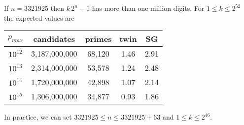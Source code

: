 \documentclass[a4paper, 12pt]{article}
\newcommand\T{\rule{0pt}{2.6ex}}
\newcommand\B{\rule[-1.4ex]{0pt}{0pt}}
\theoremstyle{plain}
\theoremstyle{definition}
\begin{document}
If $n = 3321925$ then $k\,2^n - 1$ has more than one million digits.
For $1 \leq k \leq 2^{52}$ the expected values are
\begin{center}
\begin{tabular}{ccccc}
$p_{max}$ & candidates & primes & twin & SG \B\\
\hline \T
$10^{12}$ & 3,187,000,000 & 68,120 & 1.46 & 2.91 \B \\
$10^{13}$ & 2,314,000,000 & 53,578 & 1.24 & 2.48 \B \\
$10^{14}$ & 1,720,000,000 & 42,898 & 1.07 & 2.14 \B \\
$10^{15}$ & 1,306,000,000 & 34,877 & 0.93 & 1.86
\end{tabular}
\bigskip
\end{center}

In practice, we can set $3321925 \leq n \leq 3321925 + 63$ and $1 \leq k \leq 2^{46}$.
\end{document}
